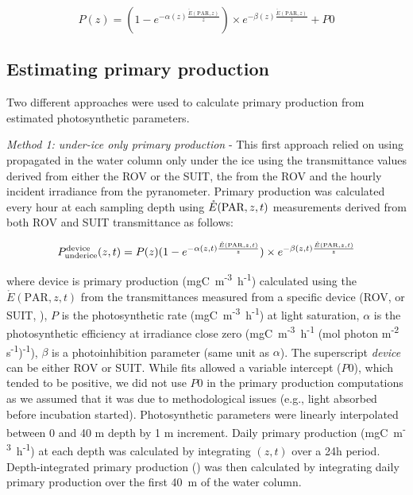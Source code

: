 \begin{linenomath*}
	\begin{equation}
P(z) = (1 - e^{-\alpha(z)\frac{\mathring{E}(\text{PAR}, z)}{z}}) \times e^{-\beta(z)\frac{\mathring{E}(\text{PAR}, z)}{z}} + P0
\end{equation}
\end{linenomath*}



\subsection{Estimating primary production}

Two different approaches were used to calculate primary production from estimated photosynthetic parameters.

\textit{Method 1: under-ice only primary production} - This first approach relied on using \eparscalar{} propagated in the water column only under the ice using the transmittance values derived from either the ROV or the SUIT, the \kdparscalar{} from the ROV and the hourly incident irradiance from the pyranometer. Primary production was calculated every hour at each sampling depth using $\mathring{E}(\textnormal{PAR}, z, t)$ measurements derived from both ROV and SUIT transmittance as follows:

\begin{linenomath*}
    \begin{equation}
		\ppundericedevice{}(z,t) = P(z)(1 - e^{-\alpha(z,t)\frac{\mathring{E}(\text{PAR}, z, t)}{z}}) \times e^{-\beta(z,t)\frac{\mathring{E}(\text{PAR}, z, t)}{z}}
	\end{equation}
\end{linenomath*}

\noindent where \ppundericedevice{} device is primary production (mgC~m\textsuperscript{-3}~h\textsuperscript{-1}) calculated using the $\mathring{E}(\text{PAR}, z, t)$ from the transmittances measured from a specific device (ROV, \pprovunderice{} or SUIT, \ppsuitunderice{}), $P$ is the photosynthetic rate (mgC~m\textsuperscript{-3}~h\textsuperscript{-1}) at light saturation, $\alpha$ is the photosynthetic efficiency at irradiance close zero (mgC~m\textsuperscript{-3}~h\textsuperscript{-1} (\textmu mol photon m\textsuperscript{-2} s\textsuperscript{-1})\textsuperscript{-1}), $\beta$ is a photoinhibition parameter (same unit as $\alpha$). The superscript \textit{device} can be either ROV or SUIT. While fits allowed a variable intercept ($P0$), which tended to be positive, we did not use $P0$ in the primary production computations as we assumed that it was due to methodological issues (e.g., light absorbed before incubation started). Photosynthetic parameters were linearly interpolated between 0 and 40 m depth by 1 m increment. Daily primary production (mgC~m\textsuperscript{-3}~h\textsuperscript{-1}) at each depth was calculated by integrating \ppundericedevice{}$(z,t)$ over a 24h period. Depth-integrated primary production (\dailypp{}) was then calculated by integrating daily primary production over the first 40~m of the water column.

